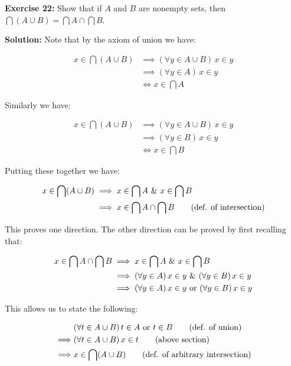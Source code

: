 \documentclass{article}
\begin{document}
\noindent\textbf{Exercise 22:} Show that if $A$ and $B$ are nonempty sets, then $\bigcap(A\cup B) = \bigcap A \cap \bigcap B$.
\bigskip

\noindent\textbf{Solution:} Note that by the axiom of union we have:

\begin{align*}
    x\in\bigcap(A\cup B)&\implies (\forall y\in A\cup B)\,x\in y\tag{def. of arbitrary intersection}\\
    &\implies (\forall y\in A)\,x\in y\tag{$A\subseteq A\cup B$}\\
    &\iff x\in\bigcap A\tag{def. of arbitrary intersection}
\end{align*}

Similarly we have:

\begin{align*}
    x\in\bigcap(A\cup B)&\implies (\forall y\in A\cup B)\,x\in y\tag{def. of arbitrary intersection}\\
    &\implies (\forall y\in B)\,x\in y\tag{$B\subseteq A\cup B$}\\
    &\iff x\in\bigcap B\tag{def. of arbitrary intersection}
\end{align*}

Putting these together we have:

\begin{align*}
    x\in\bigcap(A\cup B)&\implies x\in\bigcap A\,\,\&\,\, x\in\bigcap B\\
    &\implies x\in\bigcap A \cap \bigcap B\tag{def. of intersection}
\end{align*}

This proves one direction. The other direction can be proved by first recalling that:

\begin{align*}
    x\in\bigcap A \cap \bigcap B&\implies x\in\bigcap A\,\,\&\,\, x\in\bigcap B\\
    &\implies (\forall y\in A)\,x\in y\,\,\&\,\, (\forall y\in B)\,x\in y\\
    &\implies (\forall y\in A)\,x\in y\text{ or } (\forall y\in B)\,x\in y
\end{align*}

This allows us to state the following:

\begin{align*}
    &(\forall t\in A\cup B)\,t\in A \text{ or } t\in B\tag{def. of union}\\
    \implies&(\forall t\in A\cup B)\,x\in t\tag{above section}\\
    \implies& x\in\bigcap(A\cup B)\tag{def. of arbitrary intersection}
\end{align*}
\end{document}

